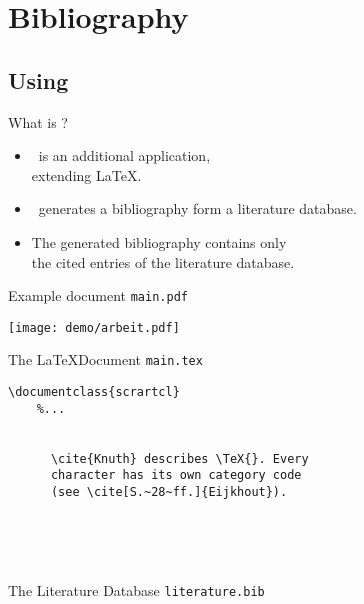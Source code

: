 
\section{Bibliography}

\subsection{Using \texorpdfstring{\BibTeX}{BibTeX}}

\begin{frame}[fragile]{What is \BibTeX?}
  \begin{itemize}
    \item \BibTeX\ is an \alert{additional application},\\
    extending \LaTeX.
    \item \BibTeX\ generates a bibliography form a \alert{literature database}.
    \item The generated bibliography \alert{contains only\\
      the cited entries} of the literature database.
  \end{itemize}
\end{frame}

\begin{frame}{Example document \texttt{main.pdf}}
  \centerline{\texttt{[image: demo/arbeit.pdf]}}
\end{frame}

\begin{frame}[fragile]{The \LaTeX Document \texttt{main.tex}}
  \begin{lstlisting}[gobble=4]
    \documentclass{scrartcl}
    %...

    
      \cite{Knuth} describes \TeX{}. Every
      character has its own category code
      (see \cite[S.~28~ff.]{Eijkhout}).

      
      
    
  \end{lstlisting}
\end{frame}

\begin{frame}{The Literature Database \texttt{literature.bib}}
  
\end{frame}

